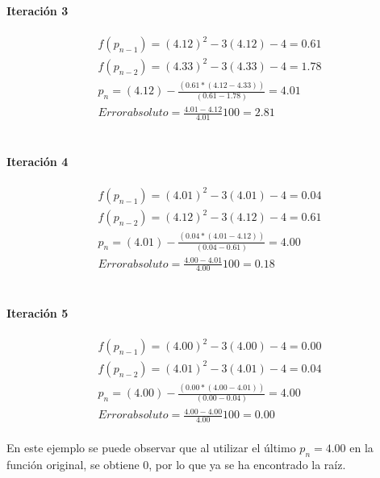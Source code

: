 \paragraph{Iteración 3}
\begin{gather*}
    f(p_{n-1}) =(4.12)^{2}-3(4.12)-4 = 0.61 \\
    f(p_{n-2}) =(4.33)^{2}-3(4.33)-4 = 1.78 \\
    p_n = (4.12)- \frac{(0.61*(4.12-4.33))}{(0.61-1.78)} = 4.01 \\
    Error absoluto = \frac{4.01-4.12}{4.01}100 = 2.81
\end{gather*} \\

\paragraph{Iteración 4}
\begin{gather*}
    f(p_{n-1}) =(4.01)^{2}-3(4.01)-4 = 0.04 \\
    f(p_{n-2}) =(4.12)^{2}-3(4.12)-4 = 0.61 \\
    p_n = (4.01)- \frac{(0.04*(4.01-4.12))}{(0.04-0.61)} = 4.00 \\
    Error absoluto = \frac{4.00-4.01}{4.00}100 = 0.18
\end{gather*} \\

\paragraph{Iteración 5}
\begin{gather*}
    f(p_{n-1}) =(4.00)^{2}-3(4.00)-4 = 0.00 \\
    f(p_{n-2}) =(4.01)^{2}-3(4.01)-4 = 0.04 \\
    p_n = (4.00)- \frac{(0.00*(4.00-4.01))}{(0.00-0.04)} = 4.00 \\
    Error absoluto = \frac{4.00-4.00}{4.00}100 = 0.00
\end{gather*} \\

En este ejemplo se puede observar que al utilizar el último $p_n = 4.00$ en la función original, se obtiene $0$, por lo que ya se ha encontrado la raíz.
